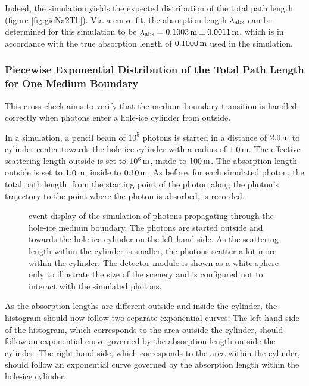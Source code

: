 Indeed, the simulation yields the expected distribution of the total
path length (figure \ref{fig:gieNa2Th}). Via a curve fit, the absorption
length \(\lambda_\text{abs}\) can be determined for this simulation to be
\(\lambda_\text{abs} = 0.1003\text{\,m} \pm 0.0011\text{\,m}\), which is in accordance with the
true absorption length of \(0.1000\text{\,m}\) used in the simulation.

\FloatBarrier\newpage
\subsubsection{Piecewise Exponential Distribution of the Total Path Length for One Medium Boundary}

This cross check aims to verify that the medium-boundary transition is
handled correctly when photons enter a hole-ice cylinder from outside.

In a simulation, a pencil beam of \(10^5\) photons is started in a
distance of \(2.0\text{\,m}\) to cylinder center towards the hole-ice cylinder
with a radius of \(1.0\text{\,m}\). The effective scattering length outside is
set to \(10^6\text{\,m}\), inside to \(100\text{\,m}\). The absorption length outside is
set to \(1.0\text{\,m}\), inside to \(0.10\text{\,m}\). As before, for each simulated
photon, the total path length, from the starting point of the photon
along the photon's trajectory to the point where the photon is absorbed,
is recorded.


\begin{figure}[htbp]
  \caption{\steamshovel event display of the simulation of photons propagating through the hole-ice medium boundary. The photons are started outside and towards the hole-ice cylinder on the left hand side. As the scattering length within the cylinder is smaller, the photons scatter a lot more within the cylinder. The detector module is shown as a white sphere only to illustrate the size of the scenery and is configured not to interact with the simulated photons.}
\end{figure}

As the absorption lengths are different outside and inside the cylinder,
the histogram should now follow two separate exponential curves: The
left hand side of the histogram, which corresponds to the area outside
the cylinder, should follow an exponential curve governed by the
absorption length outside the cylinder. The right hand side, which
corresponds to the area within the cylinder, should follow an
exponential curve governed by the absorption length within the hole-ice
cylinder.

